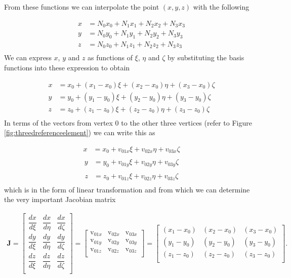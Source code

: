\documentclass[11pt,letterpaper,titlepage]{article}
\newcommand{\beq}{\begin{equation*}
\begin{aligned}}
\newcommand{\eeq}{\end{aligned}
\end{equation*}}
\newcommand{\beqn}{\begin{equation}
	\begin{aligned}}
\newcommand{\eeqn}{\end{aligned}
	\end{equation}}
\numberwithin{equation}{section}
\begin{document}
From these functions we can interpolate the point $(x,y,z)$ with the following

\beq 
x &= N_0 x_0 + N_1 x_1 + N_2 x_2 + N_3 x_3 \\
y &= N_0 y_0 + N_1 y_1 + N_2 y_2 + N_3 y_3 \\
z &= N_0 z_0 + N_1 z_1 + N_2 z_2 + N_3 z_3 \\
\eeq 
\newline
We can express $x$, $y$ and $z$ as functions of $\xi$, $\eta$ and $\zeta$ by substituting the basis functions into these expression to obtain

\beq 
x &= x_0 + (x_1-x_0)\xi + (x_2-x_0)\eta + (x_3-x_0)\zeta \\
y &= y_0 + (y_1-y_0)\xi + (y_2-y_0)\eta + (y_3-y_0)\zeta \\
z &= z_0 + (z_1-z_0)\xi + (z_2-z_0)\eta + (z_3-z_0)\zeta \\
\eeq 
\newline
In terms of the vectors from vertex $0$ to the other three vertices (refer to Figure \ref{fig:threedreferenceelement}) we can write this as

\beqn 
x &= x_0 + v_{01x}\xi + v_{02x}\eta + v_{03x}\zeta \\
\eeqn 
\beqn 
y &= y_0 + v_{01y}\xi + v_{02y}\eta + v_{03y}\zeta \\
\eeqn 
\beqn 
z &= z_0 + v_{01z}\xi + v_{02z}\eta + v_{03z}\zeta \\
\eeqn 
\newline
which is in the form of linear transformation and from which we can determine the very important Jacobian matrix

\begingroup
\renewcommand*{\arraystretch}{1.5}
\beqn \label{eq:jacobiantetrahedron} 
\mathbf{J }= 
\begin{bmatrix}
\dfrac{dx}{d\xi}     & \dfrac{dx}{d\eta}  &  \dfrac{dx}{d\zeta} \\
\dfrac{dy}{d\xi}     & \dfrac{dy}{d\eta}  &  \dfrac{dy}{d\zeta} \\
\dfrac{dz}{d\xi}     & \dfrac{dz}{d\eta}  &  \dfrac{dz}{d\zeta} \\
\end{bmatrix}=
\begin{bmatrix}
\text{v}_{01x}  & \text{v}_{02x} & \text{v}_{03x}  \\
\text{v}_{01y}  & \text{v}_{02y} & \text{v}_{03y}  \\
\text{v}_{01z}  & \text{v}_{02z} & \text{v}_{03z}  \\
\end{bmatrix}
=
\begin{bmatrix}
(x_1 - x_0) & (x_2 - x_0) & (x_3-x_0) \\
(y_1 - y_0)  & (y_2 - y_0) & (y_3-y_0) \\
(z_1 - z_0)  & (z_2 - z_0) & (z_3-z_0) \\
\end{bmatrix}.
\eeqn
\endgroup
\newline
\end{document}
